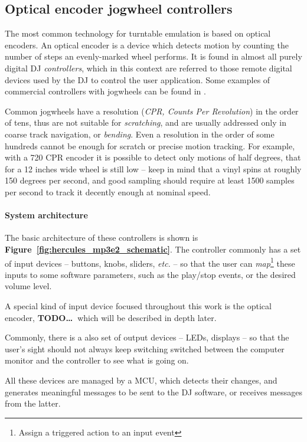 \documentclass[a4paper,10pt]{article}
\newcommand{\TODO}{\textbf{TODO\dots\ }}
\newcommand{\citef}[1]{\textbf{Figure~\ref{#1}}}
\begin{document}
\begin{multicols}{2}
\subsection{Optical encoder jogwheel controllers}

The most common technology for turntable emulation is based on optical encoders.
An optical encoder is a device which detects motion by counting the number of
steps an evenly-marked wheel performs. It is found in almost all purely digital
DJ \emph{controllers}, which in this context are referred to those remote
digital devices used by the DJ to control the user application. Some examples
of commercial controllers with jogwheels can be found in \cite{eks_op}
\cite{pioneer_ddjs1} \cite{vestax_vci400}.

Common jogwheels have a resolution (\emph{CPR, Counts Per Revolution}) in the
order of tens, thus are not suitable for \emph{scratching}, and are usually
addressed only in coarse track navigation, or \emph{bending}.
Even a resolution in the order of some hundreds cannot be enough for scratch
or precise motion tracking. For example, with a 720 CPR encoder it is possible
to detect only motions of half degrees, that for a 12 inches wide wheel is
still low -- keep in mind that a vinyl spins at roughly 150 degrees per second,
and good sampling should require at least 1500 samples per second to track it
decently enough at nominal speed.


\paragraph{System architecture}
The basic architecture of these controllers is shown is \citef{fig:hercules_mp3e2_schematic}.
The controller commonly has a set of input devices -- buttons, knobs,
sliders, \emph{etc.} -- so that the user can \emph{map}\footnote{
	Assign a triggered action to an input event
} these inputs to some software parameters, such as the play/stop events, or
the desired volume level.

A special kind of input device focused throughout this work is the optical
encoder, \TODO which will be described in depth later.

Commonly, there is a also set of output devices -- LEDs, displays -- so that
the user's sight should not always keep switching switched between the computer
monitor and the controller to see what is going on.

All these devices are managed by a MCU, which detects their changes, and
generates meaningful messages to be sent to the DJ software, or receives
messages from the latter.


\end{multicols}
\end{document}
